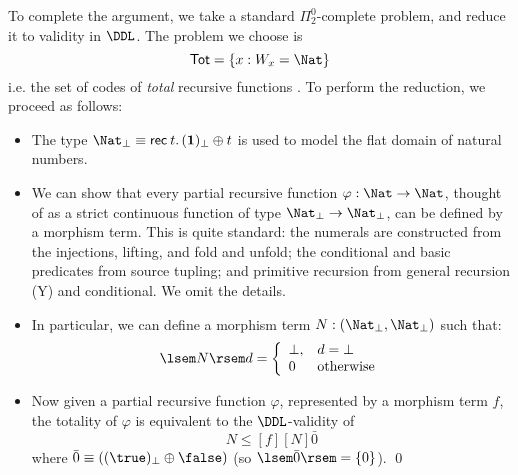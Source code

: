 To complete the argument, we take a standard $\Pi_{2}^{0}$-complete problem,
and reduce it to validity in $\DDL$.
The problem we choose is
\[ {\sf Tot} = \{ x : W_{x} = \Nat \} \]
i.e. the set of codes of {\em total} recursive functions \cite[IV.3.2]{Soa87}.
To perform the reduction, we proceed as follows:
\begin{itemize}
\item The type ${\Nat}_{\bot} \equiv {\sf rec} \: t. \, ({\bf 1})_{\bot} \oplus t$ is
used to model the flat domain of natural numbers.
\item We can show that every partial recursive function $\varphi : \Nat \rightarrow \Nat$, thought of as a strict continuous function of type 
${\Nat}_{\bot} \rightarrow {\Nat}_{\bot}$, can be defined by a morphism term.
This is quite standard: the numerals are constructed from the injections,
lifting, 
and {\sf fold} and {\sf unfold}; the conditional and basic predicates from source tupling; and primitive recursion from general recursion ({\sf Y}) and conditional.
We omit the details.
\item In particular, we can define a morphism term 
$N : ({\Nat}_{\bot}, {\Nat}_{\bot})$ such that:
\[ \lsem N \rsem d = \left\{ \begin{array}{ll}
\bot , & d = \bot \\
0  & \mbox{otherwise}
\end{array}
\right. \]
\item Now given a partial recursive function $\varphi$, represented
by a morphism term $f$, the totality of $\varphi$ is equivalent to the $\DDL$-validity of
\[ N \leq [f][N]\bar{0}  \]
where $\bar{0} \equiv ((\true )_{\bot} \oplus \false)$ (so $\lsem \bar{0} \rsem = \{ 0 \}$). \qed
\end{itemize}
